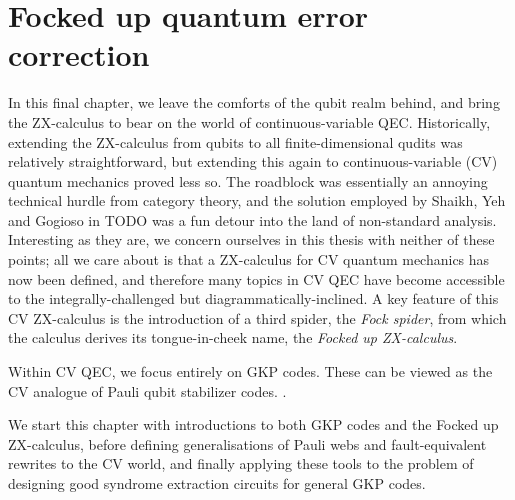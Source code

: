 \chapter{Focked up quantum error correction}\label{ch:focked-up}

In this final chapter, we leave the comforts of the qubit realm behind, and bring the ZX-calculus to bear on the world of continuous-variable QEC.
Historically, extending the ZX-calculus from qubits to all finite-dimensional qudits was relatively straightforward, but extending this again to continuous-variable (CV) quantum mechanics proved less so.
The roadblock was essentially an annoying technical hurdle from category theory, and the solution employed by Shaikh, Yeh and Gogioso in TODO was a fun detour into the land of non-standard analysis.
Interesting as they are, we concern ourselves in this thesis with neither of these points; all we care about is that a ZX-calculus for CV quantum mechanics has now been defined, and therefore many topics in CV QEC have become accessible to the integrally-challenged but diagrammatically-inclined.
A key feature of this CV ZX-calculus is the introduction of a third spider, the \textit{Fock spider}, from which the calculus derives its tongue-in-cheek name, the \textit{Focked up ZX-calculus}.


Within CV QEC, we focus entirely on GKP codes.
These can be viewed as the CV analogue of Pauli qubit stabilizer codes.
.

We start this chapter with introductions to both GKP codes and the Focked up ZX-calculus, before defining generalisations of Pauli webs and fault-equivalent rewrites to the CV world, and finally applying these tools to the problem of designing good syndrome extraction circuits for general GKP codes.


